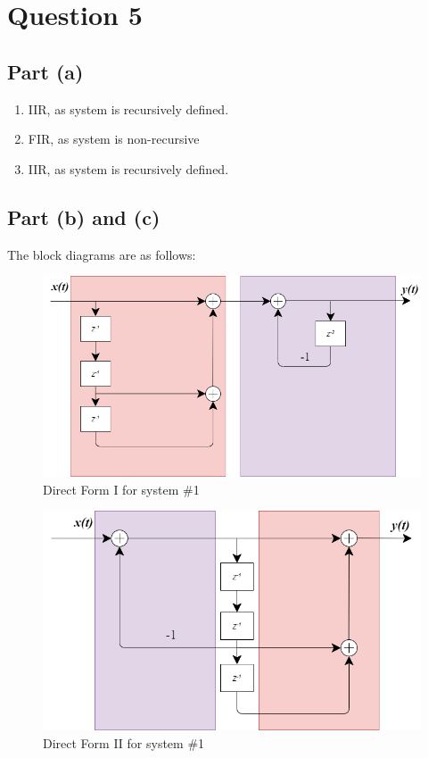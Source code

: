 \documentclass[12pt,letterpaper]{article}
\begin{document}
\pagebreak
\section*{Question 5}
\subsection*{Part (a)}
\begin{enumerate}
    \item IIR, as system is recursively defined. 
    \item FIR, as system is non-recursive
    \item IIR, as system is recursively defined. 
\end{enumerate}
\subsection*{Part (b) and (c)}
The block diagrams are as follows: 

\begin{figure}[H]
    \centering
    \includegraphics[scale = 0.6]{figures/HW1Q5b1.png}
    \caption{Direct Form I for system \#1}
    \label{5a}
\end{figure}

\begin{figure}[H]
    \centering
    \includegraphics[scale = 0.6]{figures/HW1Q5b3.png}
    \caption{Direct Form II for system \#1}
    \label{5a}
\end{figure}
\end{document}

